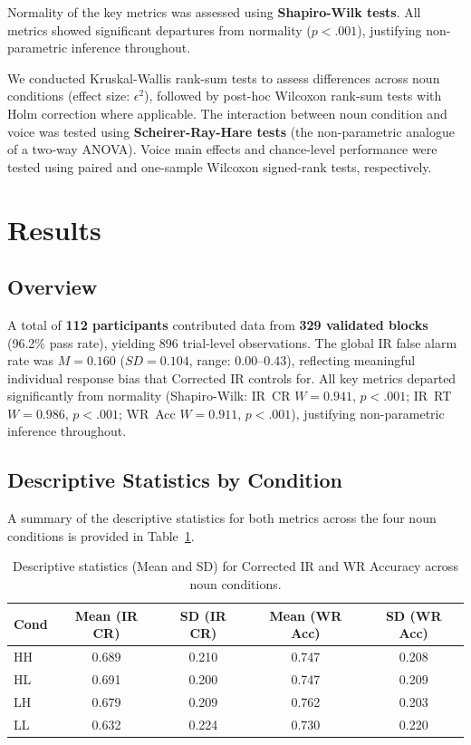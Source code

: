 \documentclass[12pt, a4paper]{article}
\begin{document}
Normality of the key metrics was assessed using \textbf{Shapiro-Wilk tests}. All metrics showed significant departures from normality ($p < .001$), justifying non-parametric inference throughout.

We conducted Kruskal-Wallis rank-sum tests to assess differences across noun conditions (effect size: $\epsilon^2$), followed by post-hoc Wilcoxon rank-sum tests with Holm correction where applicable. The interaction between noun condition and voice was tested using \textbf{Scheirer-Ray-Hare tests} (the non-parametric analogue of a two-way ANOVA). Voice main effects and chance-level performance were tested using paired and one-sample Wilcoxon signed-rank tests, respectively.

\section{Results}

\subsection{Overview}

A total of \textbf{112 participants} contributed data from \textbf{329 validated blocks} (96.2\% pass rate), yielding 896 trial-level observations. The global IR false alarm rate was $M = 0.160$ ($SD = 0.104$, range: $0.00$--$0.43$), reflecting meaningful individual response bias that Corrected IR controls for. All key metrics departed significantly from normality (Shapiro-Wilk: IR~CR $W = 0.941$, $p < .001$; IR~RT $W = 0.986$, $p < .001$; WR~Acc $W = 0.911$, $p < .001$), justifying non-parametric inference throughout.

\subsection{Descriptive Statistics by Condition}

A summary of the descriptive statistics for both metrics across the four noun conditions is provided in Table~\ref{tab:descriptives}.

\begin{table}[htbp]
  \centering
  \small
  \begin{tabular}{lcccc}
    \toprule
    \textbf{Cond} & \textbf{Mean (IR CR)} & \textbf{SD (IR CR)} & \textbf{Mean (WR Acc)} & \textbf{SD (WR Acc)} \\
    \midrule
    HH & 0.689 & 0.210 & 0.747 & 0.208 \\
    HL & 0.691 & 0.200 & 0.747 & 0.209 \\
    LH & 0.679 & 0.209 & 0.762 & 0.203 \\
    LL & 0.632 & 0.224 & 0.730 & 0.220 \\
    \bottomrule
  \end{tabular}
  \caption{Descriptive statistics (Mean and SD) for Corrected IR and WR Accuracy across noun conditions.}
  \label{tab:descriptives}
\end{table}
\end{document}

